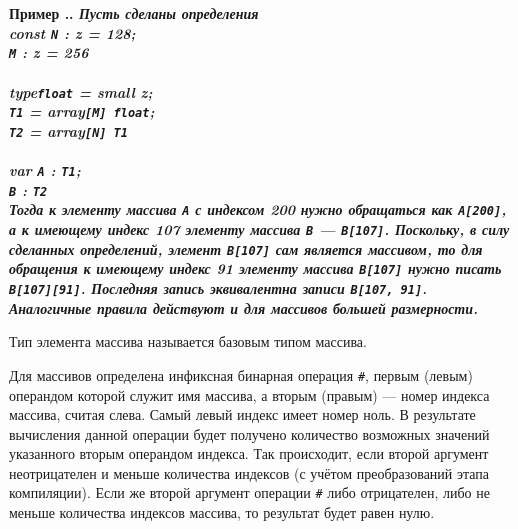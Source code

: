 \documentclass[10pt]{report}
\newcounter{exam}[section]
\renewcommand{\theexam}{\thesection.\arabic{exam}}
\newenvironment{Example}{\par\refstepcounter{exam}\bf Пример \theexam. \sl}{\rm\par}
\begin{document}
\begin{Example} \textit{Пусть сделаны определения}\\
\rm
\textbf{const} \texttt{N} : \textbf{z} = 128;\\
\hspace*{10mm} \texttt{M} : \textbf{z} = 256\\
\\
\textbf{type}\hspace*{5mm}\texttt{float} = \textbf{small z};\\
\hspace*{12mm}\texttt{T1} = \textbf{array}\texttt{[M] float};\\
\hspace*{12mm}\texttt{T2} = \textbf{array}\texttt{[N] T1}\\
\\
\textbf{var} \texttt{A} : \texttt{T1};\\
\hspace*{11mm} \texttt{B} : \texttt{T2}
\\
\textit{Тогда к элементу массива \texttt{A} с индексом 200 нужно обращаться как \texttt{A[200]}, а к имеющему индекс 107 элементу массива \texttt{B} --- \texttt{B[107]}.
Поскольку, в силу сделанных определений, элемент \texttt{B[107]} сам является массивом, то для обращения к имеющему индекс 91 элементу массива \texttt{B[107]} нужно писать
\texttt{B[107][91]}. Последняя запись эквивалентна записи \texttt{B[107, 91]}. Аналогичные правила действуют и для массивов большей размерности.}
\end{Example}

Тип элемента массива называется базовым типом массива.

Для массивов определена инфиксная бинарная операция \texttt{\#}, первым (левым) операндом которой служит имя массива, а вторым (правым) --- номер индекса массива, считая слева.
Самый левый индекс имеет номер ноль. В результате вычисления данной операции будет получено количество возможных значений указанного вторым операндом индекса. Так происходит,
если второй аргумент неотрицателен и меньше количества индексов (с учётом преобразований этапа компиляции). Если же второй аргумент операции \texttt{\#} либо отрицателен, либо
не меньше количества индексов массива, то результат будет равен нулю.
\end{document}
